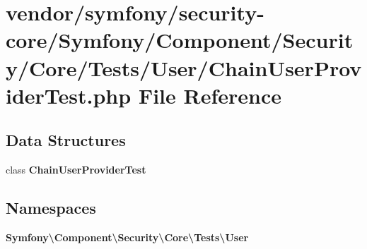 \section{vendor/symfony/security-\/core/\+Symfony/\+Component/\+Security/\+Core/\+Tests/\+User/\+Chain\+User\+Provider\+Test.php File Reference}
\label{_chain_user_provider_test_8php}
\subsection*{Data Structures}
\begin{DoxyCompactItemize}
\item 
class {\bf Chain\+User\+Provider\+Test}
\end{DoxyCompactItemize}
\subsection*{Namespaces}
\begin{DoxyCompactItemize}
\item 
 {\bf Symfony\textbackslash{}\+Component\textbackslash{}\+Security\textbackslash{}\+Core\textbackslash{}\+Tests\textbackslash{}\+User}
\end{DoxyCompactItemize}
